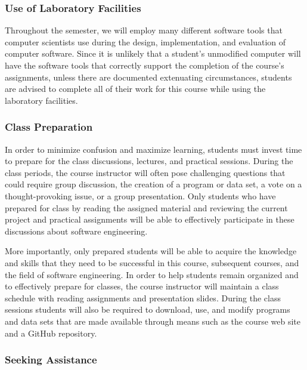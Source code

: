 \documentclass[11pt]{article}
\begin{document}
\subsubsection*{Use of Laboratory Facilities}

Throughout the semester, we will employ many different software tools that
computer scientists use during the design, implementation, and evaluation of
computer software. Since it is unlikely that a student's unmodified computer
will have the software tools that correctly support the completion of the
course's assignments, unless there are documented extenuating circumstances,
students are advised to complete all of their work for this course while using
the laboratory facilities.

\vspace*{-.1in}

\subsubsection*{Class Preparation}

In order to minimize confusion and maximize learning, students must invest time
to prepare for the class discussions, lectures, and practical sessions. During
the class periods, the course instructor will often pose challenging questions
that could require group discussion, the creation of a program or data set, a
vote on a thought-provoking issue, or a group presentation. Only students who
have prepared for class by reading the assigned material and reviewing the
current project and practical assignments will be able to effectively
participate in these discussions about software engineering.

More importantly, only prepared students will be able to acquire the knowledge
and skills that they need to be successful in this course, subsequent courses,
and the field of software engineering. In order to help students remain
organized and to effectively prepare for classes, the course instructor will
maintain a class schedule with reading assignments and presentation slides.
During the class sessions students will also be required to download, use, and
modify programs and data sets that are made available through means such as the
course web site and a GitHub repository.

\subsubsection*{Seeking Assistance}
\end{document}
